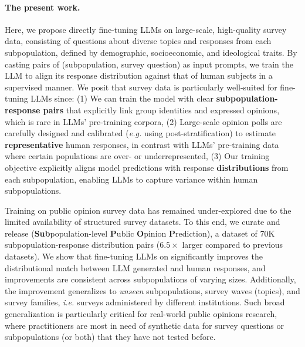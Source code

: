 \vspace{-5pt}
\paragraph{The present work.}
Here, we propose directly fine-tuning LLMs on large-scale, high-quality survey data,
consisting of questions about diverse topics and responses from each subpopulation, defined by demographic, socioeconomic, and ideological traits.
By casting pairs of (subpopulation, survey question) as input prompts, we train the LLM to align its response distribution against that of human subjects in a supervised manner.
We posit that survey data is particularly well-suited for fine-tuning LLMs since: (1) We can train the model with clear \textbf{subpopulation-response pairs} that explicitly link group identities and expressed opinions,
which is rare in LLMs' pre-training corpora,
(2) Large-scale opinion polls are carefully designed and calibrated (\textit{e.g.} using post-stratification) to estimate \textbf{representative} human responses, in contrast with LLMs' pre-training data where certain populations are over- or underrepresented, 
(3) Our training objective explicitly aligns model predictions with response \textbf{distributions} from each subpopulation, enabling LLMs to capture variance within human subpopulations.

Training on public opinion survey data has remained under-explored due to the limited availability of structured survey datasets. 
To this end, we curate and release \textbf{\OURDATA} (\textbf{Sub}population-level \textbf{P}ublic \textbf{O}pinion \textbf{P}rediction), a dataset of 70K subpopulation-response distribution pairs ($6.5\times$ larger compared to previous datasets).
We show that fine-tuning LLMs on \OURDATA significantly improves the distributional match between LLM generated and human responses, and improvements are consistent across subpopulations of varying sizes.
Additionally, the improvement generalizes to \textit{unseen} subpopulations, survey waves (topics), and survey families, \textit{i.e.} surveys administered by different institutions.
Such broad generalization is particularly critical for real-world public opinions research, where practitioners are most in need of synthetic data for survey questions or subpopulations (or both) that they have not tested before.


